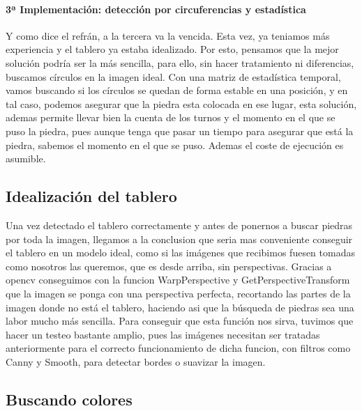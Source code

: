 \documentclass[12pt,a4paper]{report}
\begin{document}
\paragraph{3ª Implementación: detección por circuferencias y estadística}
Y como dice el refrán, a la tercera va la vencida. Esta vez, ya teniamos más
experiencia y el tablero ya estaba idealizado. Por esto, pensamos que la mejor
solución podría ser la más sencilla, para ello, sin hacer tratamiento ni
diferencias, buscamos círculos en la imagen ideal. Con una matriz de estadística
temporal, vamos buscando si los círculos se quedan de forma estable en una
posición, y en tal caso, podemos asegurar que la piedra esta colocada en ese
lugar, esta solución, ademas permite llevar bien la cuenta de los turnos y el
momento en el que se puso la piedra, pues aunque tenga que pasar un tiempo para
asegurar que está la piedra, sabemos el momento en el que se puso. Ademas el
coste de ejecución es asumible.


\subsection{Idealización del tablero} 

Una vez detectado el tablero correctamente y antes de ponernos a buscar piedras
por toda la imagen, llegamos a la conclusion que seria mas conveniente conseguir
el tablero en un modelo ideal, como si las imágenes que recibimos fuesen tomadas
como nosotros las queremos, que es desde arriba, sin perspectivas.  Gracias a
opencv conseguimos con la funcion WarpPerspective y GetPerspectiveTransform que 
la imagen se ponga con una
perspectiva perfecta, recortando las partes de la imagen donde no está el
tablero, haciendo asi que la búsqueda de piedras sea una labor mucho más
sencilla. Para conseguir que esta función nos sirva, tuvimos que hacer un
testeo bastante amplio, pues las imágenes necesitan ser tratadas anteriormente
para el correcto funcionamiento de dicha funcion, con filtros como Canny y
Smooth, para detectar bordes o suavizar la imagen. 

\subsection{Buscando colores}%
\end{document}
